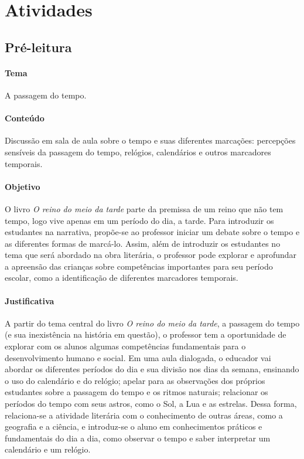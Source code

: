 \documentclass[11pt]{extarticle}
\begin{document}
\section{Atividades}

\subsection{Pré-leitura}


\paragraph{Tema} A passagem do tempo.

\paragraph{Conteúdo} Discussão em sala de aula sobre o tempo e suas diferentes marcações: percepções sensíveis da passagem do tempo, relógios, calendários e outros marcadores temporais.

\paragraph{Objetivo} O livro \textit{O reino do meio da tarde} parte da premissa de um reino que não tem tempo, logo vive apenas em um período do dia, a tarde. Para introduzir os estudantes na narrativa, propõe-se ao professor iniciar um debate sobre o tempo e as diferentes formas de marcá-lo. Assim, além de introduzir os estudantes no tema que será abordado na obra literária, o professor pode explorar e aprofundar a apreensão das crianças sobre competências importantes para seu período escolar, como a identificação de diferentes marcadores temporais. 

\paragraph{Justificativa} A partir do tema central do livro \textit{O reino do meio da tarde}, a passagem do tempo (e sua inexistência na história em questão), o professor tem a oportunidade de explorar com os alunos algumas competências fundamentais para o desenvolvimento humano e social. Em uma aula dialogada, o educador vai abordar os diferentes períodos do dia e sua divisão nos dias da semana, ensinando o uso do calendário e do relógio; apelar para as observações dos próprios estudantes sobre a passagem do tempo e os ritmos naturais; relacionar os períodos do tempo com seus astros, como o Sol, a Lua e as estrelas. Dessa forma, relaciona-se a atividade literária com o conhecimento de outras áreas, como a geografia e a ciência, e introduz-se o aluno em conhecimentos práticos e fundamentais do dia a dia, como observar o tempo e saber interpretar um calendário e um relógio.
\end{document}
